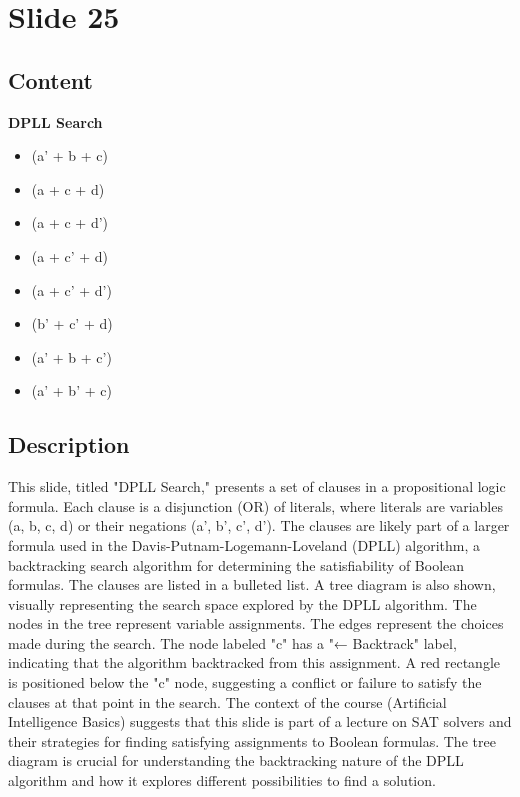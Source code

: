\documentclass{article}%
\begin{document}
%
\newpage%
\section{Slide 25}%
\label{sec:Slide25}%
\subsection{Content}%

\textbf{DPLL Search}

\begin{itemize}
    \item (a' + b + c)
    \item (a + c + d)
    \item (a + c + d')
    \item (a + c' + d)
    \item (a + c' + d')
    \item (b' + c' + d)
    \item (a' + b + c')
    \item (a' + b' + c)
\end{itemize}

%
\subsection{Description}%
This slide, titled "DPLL Search," presents a set of clauses in a propositional logic formula.  Each clause is a disjunction (OR) of literals, where literals are variables (a, b, c, d) or their negations (a', b', c', d').  The clauses are likely part of a larger formula used in the Davis-Putnam-Logemann-Loveland (DPLL) algorithm, a backtracking search algorithm for determining the satisfiability of Boolean formulas.  The clauses are listed in a bulleted list.  A tree diagram is also shown, visually representing the search space explored by the DPLL algorithm.  The nodes in the tree represent variable assignments.  The edges represent the choices made during the search.  The node labeled "c" has a "← Backtrack" label, indicating that the algorithm backtracked from this assignment.  A red rectangle is positioned below the "c" node, suggesting a conflict or failure to satisfy the clauses at that point in the search.  The context of the course (Artificial Intelligence Basics) suggests that this slide is part of a lecture on SAT solvers and their strategies for finding satisfying assignments to Boolean formulas. The tree diagram is crucial for understanding the backtracking nature of the DPLL algorithm and how it explores different possibilities to find a solution.%
\end{document}
